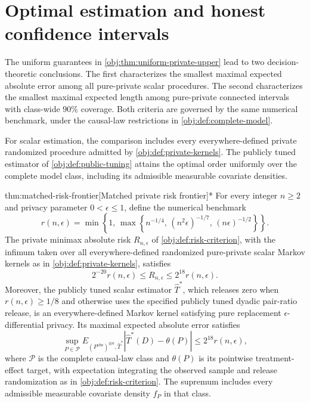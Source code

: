 \section{Optimal estimation and honest confidence intervals}

The uniform guarantees in \cref{obj:thm:uniform-private-upper} lead to two decision-theoretic conclusions. The first characterizes the smallest maximal expected absolute error among all pure-private scalar procedures. The second characterizes the smallest maximal expected length among pure-private connected intervals with class-wide \(90\%\) coverage. Both criteria are governed by the same numerical benchmark, under the causal-law restrictions in \cref{obj:def:complete-model}.

For scalar estimation, the comparison includes every everywhere-defined private randomized procedure admitted by \cref{obj:def:private-kernels}. The publicly tuned estimator of \cref{obj:def:public-tuning} attains the optimal order uniformly over the complete model class, including its admissible measurable covariate densities.

\begin{theoremv}{thm:matched-risk-frontier}[Matched private risk frontier]*
For every integer \(n\ge2\) and privacy parameter \(0<\epsilon\le1\), define the numerical benchmark
\[
r(n,\epsilon)
=
\min\left\{1,\,
\max\left\{n^{-1/4},\,(n^2\epsilon)^{-1/7},\,(n\epsilon)^{-1/2}\right\}\right\}.
\]
The private minimax absolute risk \(R_{n,\epsilon}\) of \cref{obj:def:risk-criterion}, with the infimum taken over all everywhere-defined randomized pure-private scalar Markov kernels as in \cref{obj:def:private-kernels}, satisfies
\[
2^{-20}r(n,\epsilon)
\le R_{n,\epsilon}
\le 2^{18}r(n,\epsilon).
\]
Moreover, the publicly tuned scalar estimator \(\widehat T^*\), which releases zero when \(r(n,\epsilon)\ge1/8\) and otherwise uses the specified publicly tuned dyadic pair-ratio release, is an everywhere-defined Markov kernel satisfying pure replacement \(\epsilon\)-differential privacy. Its maximal expected absolute error satisfies
\[
\sup_{P\in\mathcal P}
E_{(P^{\mathrm{obs}})^{\otimes n},\widehat T^*}
\left|\widehat T^*(D)-\theta(P)\right|
\le 2^{18}r(n,\epsilon),
\]
where \(\mathcal P\) is the complete causal-law class and \(\theta(P)\) is its pointwise treatment-effect target, with expectation integrating the observed sample and release randomization as in \cref{obj:def:risk-criterion}. The supremum includes every admissible measurable covariate density \(f_P\) in that class.
\end{theoremv}

